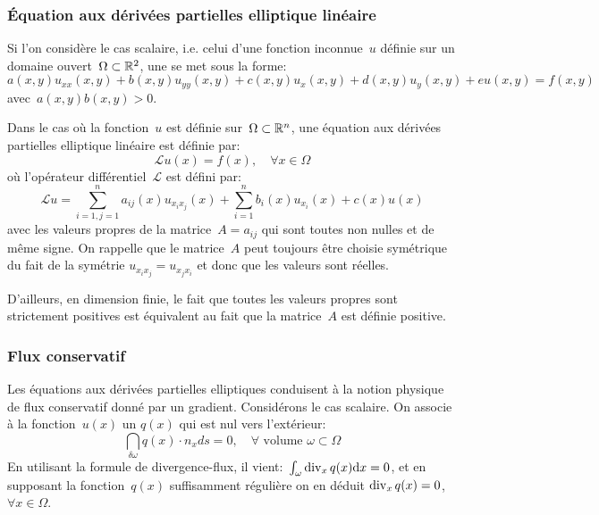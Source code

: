 \medskip
\subsubsection{Équation aux dérivées partielles elliptique linéaire}
Si l'on considère le cas scalaire, i.e. celui d'une fonction inconnue~$u$ définie sur un domaine ouvert~$\Omega\subset\mathbb R^2$, une  se met sous la forme:
\begin{equation}a(x, y)u_{xx}(x, y) + b(x, y)u_{yy}(x, y) + c(x, y)u_x(x, y) + d(x, y)u_y(x, y) + eu(x, y) = f(x, y)\end{equation}
avec~$a(x, y)b(x, y) > 0$.

Dans le cas où la fonction~$u$ est définie sur~$\Omega\subset\mathbb R^n$, une équation aux dérivées partielles elliptique linéaire est définie par:
\begin{equation} \mathcal{L}u(x) = f(x),\quad \forall x\in\Omega \end{equation}
où l'opérateur différentiel~$\mathcal{L}$ est défini par:
\begin{equation}
\mathcal{L}u = \sum_{i=1, j=1}^n a_{ij}(x)u_{x_ix_j} (x) +
\sum_{i=1}^n b_i(x)u_{x_i}(x) + c(x)u(x)
\end{equation}
avec les valeurs propres de la matrice~$A = a_{ij}$ qui sont toutes non nulles et de même signe. 
On rappelle que le matrice~$A$ peut toujours être choisie symétrique du fait de la symétrie $u_{x_ix_j} = u_{x_jx_i}$ et donc que les valeurs sont réelles.

D'ailleurs, en dimension finie, le fait que toutes les valeurs propres sont strictement positives est équivalent au fait que la matrice~$A$ est définie positive.

\medskip
\subsubsection{Flux conservatif}
Les équations aux dérivées partielles elliptiques conduisent à la notion physique de flux conservatif donné
par un gradient. Considérons le cas scalaire. On associe à la fonction~$u(x)$ un 
$q(x)$ qui est nul vers l'extérieur:
\begin{equation}\dint_{\delta\omega} q(x)\cdot n_x ds=0,\quad\forall\text{ volume }\omega\subset\Omega\end{equation}
En utilisant la formule de divergence-flux, il vient:~$\int_\omega \operatorname{div}_xq(x)\mathrm dx=0$, et en supposant la fonction~$q(x)$ suffisamment régulière on en déduit $\operatorname{div}_xq(x)=0$, $\forall x\in\Omega$.

